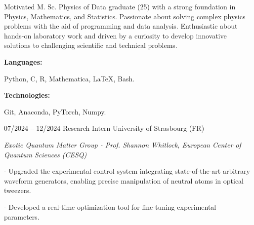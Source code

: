 \documentclass[9pt]{developercv} %
\begin{document}
\begin{minipage}[t]{0.46\textwidth}
	\vspace{-6pt}
 
	Motivated M. Sc. Physics of Data graduate (25) with a strong foundation in Physics, Mathematics, and Statistics. Passionate about solving complex physics problems with the aid of programming and data analysis. Enthusiastic about hands-on laboratory work and driven by a curiosity to develop innovative solutions to challenging scientific and technical problems. \\
 
\end{minipage}
\hfill %
\begin{minipage}[t]{0.465\textwidth}
    \vspace{-6pt}
    
    \begin{minipage}[t]{0.2\textwidth}
        \textbf{Languages:}
    \end{minipage}
    \hfill
    \begin{minipage}[t]{0.73\textwidth}
      Python, C, R, Mathematica, \LaTeX, Bash.
    \end{minipage}
    \vspace{4mm}
    
    \begin{minipage}[t]{0.2\textwidth}
        \textbf{Technologies:}
    \end{minipage}
    \hfill
    \begin{minipage}[t]{0.73\textwidth}
      Git, Anaconda, PyTorch, Numpy.
    \end{minipage}
    
\end{minipage}


\vspace{-10 pt}
\begin{entrylist}
	\entry
        {07/2024 -- 12/2024}
		{Research Intern}
		{University of Strasbourg (FR)}
            {\textit{Exotic Quantum Matter Group - Prof. Shannon Whitlock, European Center of Quantum Sciences (CESQ)}

            - Upgraded the experimental control system integrating state-of-the-art arbitrary waveform generators, enabling precise manipulation of neutral atoms in optical tweezers.

            - Developed a real-time optimization tool for fine-tuning experimental parameters.
            }	
\end{entrylist}
\end{document}
